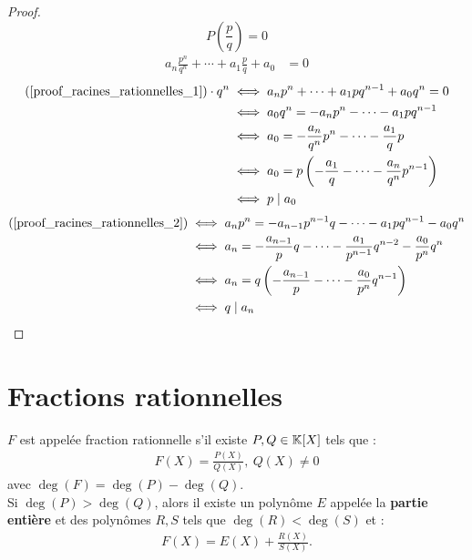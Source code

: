 \begin{proof}
	\[ P \left(\frac{p}{q}\right) = 0 \]
	\begin{align}\label{proof_racines_rationnelles_1}
		a_n \frac{p^n}{q^n} + \cdots + a_1 \frac{p}{q} + a_0 &= 0 
	\end{align}
	\begin{align}\label{proof_racines_rationnelles_2}
		(\ref{proof_racines_rationnelles_1}) \cdot q^n &\iff a_n p^n + \cdots + a_1 p q^{n-1} + a_0 q^n = 0 \\
	&\iff a_0 q^n = -a_n p^n - \cdots - a_1 p q^{n-1} \nonumber \\
	&\iff a_0 = -\frac{a_n}{q^n} p^n - \cdots - \frac{a_1}{q} p \nonumber \\
	&\iff a_0 = p \left( - \frac{a_1}{q} - \cdots - \frac{a_n}{q^n} p^{n-1} \right) \nonumber \\
	&\iff p \mid a_0 \nonumber
	\end{align}
	\begin{align*}
		(\ref{proof_racines_rationnelles_2}) &\iff a_n p^n = - a_{n-1} p^{n-1} q - \cdots - a_1 p q^{n-1} - a_0 q^n \\
		&\iff a_n = - \frac{a_{n-1}}{p} q - \cdots - \frac{a_1}{p^{n-1}} q^{n-2} - \frac{a_0}{p^n} q^n \\
		&\iff a_n = q \left( -\frac{a_{n-1}}{p} - \cdots - \frac{a_0}{p^n} q^{n-1} \right) \\
		&\iff q \mid a_n
	\end{align*}
\end{proof}

\section{Fractions rationnelles}
\begin{definition}
	$F$ est appelée fraction rationnelle s'il existe $P, Q \in \mathbb{K}[X]$ tels que :
	\begin{align*}
		F(X) = \frac{P(X)}{Q(X)},\ Q(X) \neq 0
	\end{align*}
	avec $\deg(F) = \deg(P) - \deg(Q)$. \\
	Si $\deg(P) > \deg(Q)$, alors il existe un polynôme $E$ appelée la \textbf{partie entière} et des polynômes $R, S$ tels que $\deg(R) < \deg(S)$ et : 
	\begin{align*}
		F(X) = E(X) + \frac{R(X)}{S(X)}.
	\end{align*}
\end{definition}

